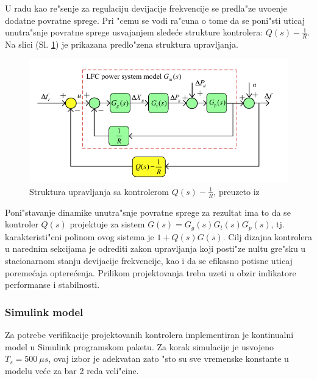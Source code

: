 \documentclass[a4paper,11pt]{article}
\theoremstyle{definition} \newtheorem{deff}{Definicija}[section]
\theoremstyle{definition} \newtheorem{prim}[deff]{Primer}
\theoremstyle{plain} \newtheorem{teor}[deff]{Teorema}
\begin{document}
	U radu \cite{inicijalna} kao re"senje za regulaciju devijacije frekvencije se predla"ze uvo\dj{}enje dodatne povratne sprege. Pri "cemu se vodi ra"cuna o tome da se poni"sti uticaj unutra"snje povratne sprege usvajanjem slede\'ce strukture kontrolera: $Q(s) - \frac{1}{R}$. Na slici (Sl. \ref{fig:kontroler_model}) je prikazana predlo"zena struktura upravljanja. 
	
	
	\begin{figure}[!htb]
		\centering
		\includegraphics[width=\linewidth]{slike/kontroler_model.png}
		
		\caption{Struktura upravljanja sa kontrolerom $Q(s) - \frac{1}{R}$, preuzeto iz \cite{inicijalna}}
		\label{fig:kontroler_model}
	\end{figure}
	
	Poni"stavanje dinamike unutra"snje povratne sprege za rezultat ima to da se kontroler $Q(s)$ projektuje za sistem $G(s) = G_g(s)G_t(s)G_p(s)$, tj. karakteristi"cni polinom ovog sistema je $1+Q(s)G(s)$. Cilj dizajna kontrolera u narednim sekcijama je odrediti zakon upravljanja koji posti"ze nultu gre"sku u stacionarnom stanju devijacije frekvencije, kao i da se efikasno potisne uticaj poreme\'caja optere\'cenja. Prilikom projektovanja treba uzeti u obzir indikatore performanse i stabilnosti.  \\
	
	
	\subsubsection{Simulink model}\label{sec:matlab_model}
	
	Za potrebe verifikacije projektovanih kontrolera implementiran je kontinualni model u Simulink programskom paketu. Za korak simulacije je usvojeno $T_s = 500~\unit{\mu s}$, ovaj izbor je adekvatan zato "sto su sve vremenske konstante u modelu ve\'ce za bar 2 reda veli"cine.
	
\end{document}
